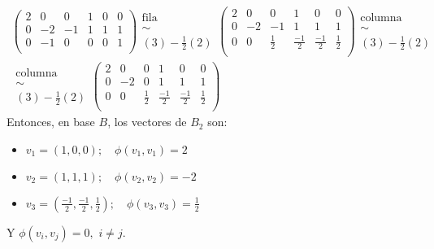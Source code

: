 \begin{example}
\begin{gather*}
		\left(
		\begin{array}{ccc|ccc}
			2 & 0 & 0 & 1 & 0 & 0 \\
			0 & -2 & -1 & 1 & 1 & 1 \\
			0 & -1 & 0 & 0 & 0 & 1 \\
		\end{array}
		\right)
		\substack{\text{fila} \\ \sim \\ (3) - \frac{1}{2}(2)}
		\left(
		\begin{array}{ccc|ccc}
			2 & 0 & 0 & 1 & 0 & 0 \\
			0 & -2 & -1 & 1 & 1 & 1 \\
			0 & 0 & \frac{1}{2} & \frac{-1}{2} & \frac{-1}{2} & \frac{1}{2} \\
		\end{array}
		\right)
		\substack{\text{columna} \\ \sim \\ (3) - \frac{1}{2}(2)}
		\\
		\substack{\text{columna} \\ \sim \\ (3) - \frac{1}{2}(2)}
		\left(
		\begin{array}{ccc|ccc}
			2 & 0 & 0 & 1 & 0 & 0 \\
			0 & -2 & 0 & 1 & 1 & 1 \\
			0 & 0 & \frac{1}{2} & \frac{-1}{2} & \frac{-1}{2} & \frac{1}{2} \\
		\end{array}
		\right)
	\end{gather*}
	Entonces, en base $B$, los vectores de $B_2$ son:
	\begin{itemize}
		\item $v_1 = (1,0,0); \quad \phi (v_1, v_1) = 2$
		\item $v_2 = (1,1,1); \quad \phi (v_2, v_2) = -2$
		\item $v_3 = (\frac{-1}{2},\frac{-1}{2},\frac{1}{2}); \quad \phi (v_3,v_3) = \frac{1}{2}$
	\end{itemize}
	Y $\phi(v_i, v_j) = 0,$ $i \neq j$.
\end{example}